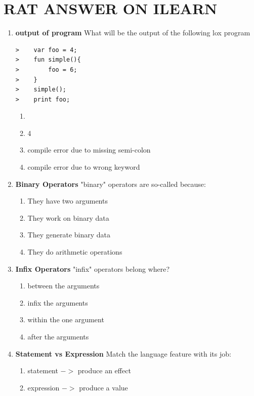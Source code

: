 \documentclass[twoside=false, DIV=14]{scrartcl}
\begin{document}
\newpage
\part*{RAT  \hspace{6em} {\small ANSWER ON ILEARN}}
\renewcommand{\labelenumii}{\alph{enumii}) $\square$}
\begin{enumerate}

\item \textbf{output of program}
What will be the output of the following lox program
\begin{lstlisting}
>    var foo = 4;
>    fun simple(){
>        foo = 6;
>    }
>    simple();
>    print foo;
\end{lstlisting}
\begin{enumerate}
    \item {}
    \item 4
    \item compile error due to missing semi-colon
    \item compile error due to wrong keyword
  \end{enumerate}
  
  \item \textbf{Binary Operators}
"binary" operators are so-called because:
\begin{enumerate}
    \item \tick They have two arguments
    \item They work on binary data
    \item They generate binary data
    \item They do arithmetic operations
\end{enumerate}

\item \textbf{Infix Operators}
"infix" operators belong where?
\begin{enumerate}
    \item \tick between the arguments
    \item infix the arguments
    \item within the one argument
    \item after the arguments
\end{enumerate}

\item \textbf{Statement vs Expression}
Match the language feature with its job:
\begin{enumerate}
    \item statement $->$ produce an effect
    \item expression $->$ produce a value
\end{enumerate}


\end{enumerate}
\end{document}
